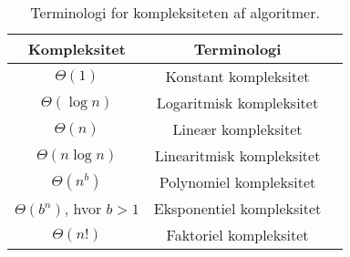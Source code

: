 \begin{table}[h]
 \centering
  \begin{tabular}{|c|c|c|}
   \hline
   Kompleksitet & Terminologi\\
   \hline
   $\Theta(1)$ & Konstant kompleksitet\\
   $\Theta(\log n)$ & Logaritmisk kompleksitet\\
   $\Theta(n)$ & Lineær kompleksitet\\
   $\Theta(n \log n)$ & Linearitmisk kompleksitet\\
   $\Theta(n^b)$ & Polynomiel kompleksitet\\
   $\Theta(b^n)$, hvor $b>1$ & Eksponentiel kompleksitet\\
   $\Theta(n!)$ & Faktoriel kompleksitet\\
   \hline
  \end{tabular}
 \caption{Terminologi for kompleksiteten af algoritmer.} \label{tab_complex}
\end{table}
